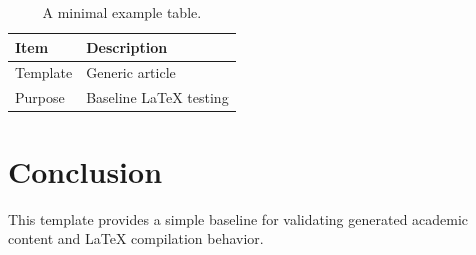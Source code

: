 \documentclass[11pt]{article}
\begin{document}
\begin{table}[h]
\centering
\begin{tabular}{ll}
\toprule
Item & Description \\
\midrule
Template & Generic article \\
Purpose & Baseline LaTeX testing \\
\bottomrule
\end{tabular}
\caption{A minimal example table.}
\label{tab:example}
\end{table}

\section{Conclusion}
This template provides a simple baseline for validating generated academic content and LaTeX compilation behavior.



\end{document}
